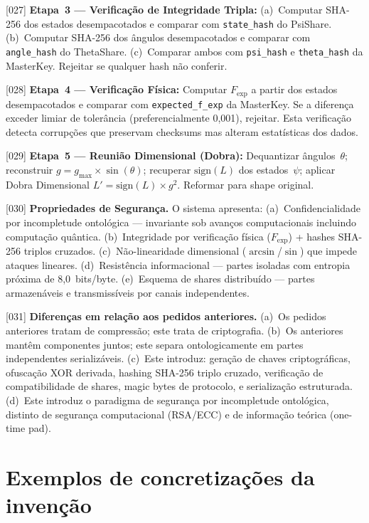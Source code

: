 \documentclass[12pt,a4paper]{article}
\newcommand{\Fexp}{F_{\text{exp}}}
\begin{document}
{[027]} \textbf{Etapa~3 --- Verificação de Integridade Tripla:}
(a)~Computar SHA-256 dos estados desempacotados e comparar com
\texttt{state\_hash} do PsiShare. (b)~Computar SHA-256 dos
ângulos desempacotados e comparar com \texttt{angle\_hash} do
ThetaShare. (c)~Comparar ambos com \texttt{psi\_hash} e
\texttt{theta\_hash} da MasterKey. Rejeitar se qualquer hash
não conferir.

{[028]} \textbf{Etapa~4 --- Verificação Física:} Computar
$\Fexp$ a partir dos estados desempacotados e comparar com
\texttt{expected\_f\_exp} da MasterKey. Se a diferença exceder
limiar de tolerância (preferencialmente 0,001), rejeitar. Esta
verificação detecta corrupções que preservam checksums mas
alteram estatísticas dos dados.

{[029]} \textbf{Etapa~5 --- Reunião Dimensional (Dobra):}
Dequantizar ângulos~$\theta$; reconstruir
$g = g_{\max} \times \sin(\theta)$; recuperar $\text{sign}(L)$
dos estados~$\psi$; aplicar Dobra Dimensional
$L' = \text{sign}(L) \times g^2$. Reformar para shape original.

{[030]} \textbf{Propriedades de Segurança.} O sistema apresenta:
(a)~Confidencialidade por incompletude ontológica --- invariante
sob avanços computacionais incluindo computação quântica.
(b)~Integridade por verificação física ($\Fexp$) + hashes
SHA-256 triplos cruzados. (c)~Não-linearidade dimensional
($\arcsin$/$\sin$) que impede ataques lineares.
(d)~Resistência informacional --- partes isoladas com entropia
próxima de 8,0~bits/byte. (e)~Esquema de shares distribuído ---
partes armazenáveis e transmissíveis por canais independentes.

{[031]} \textbf{Diferenças em relação aos pedidos anteriores.}
(a)~Os pedidos anteriores tratam de compressão; este trata de
criptografia. (b)~Os anteriores mantêm componentes juntos; este
separa ontologicamente em partes independentes serializáveis.
(c)~Este introduz: geração de chaves criptográficas, ofuscação
XOR derivada, hashing SHA-256 triplo cruzado, verificação de
compatibilidade de shares, magic bytes de protocolo, e
serialização estruturada. (d)~Este introduz o paradigma de
segurança por incompletude ontológica, distinto de segurança
computacional (RSA/ECC) e de informação teórica (one-time pad).

\section{Exemplos de concretizações da invenção}
\end{document}
